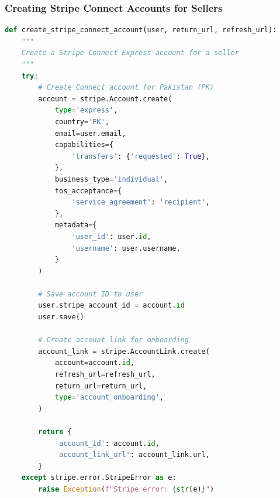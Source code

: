 \documentclass[12pt,a4paper]{article}
\begin{document}
\subsubsection{Creating Stripe Connect Accounts for Sellers}
\begin{lstlisting}[language=Python, caption={Stripe Connect Account Creation (api/stripe\_utils.py)}]
def create_stripe_connect_account(user, return_url, refresh_url):
    """
    Create a Stripe Connect Express account for a seller
    """
    try:
        # Create Connect account for Pakistan (PK)
        account = stripe.Account.create(
            type='express',
            country='PK',
            email=user.email,
            capabilities={
                'transfers': {'requested': True},
            },
            business_type='individual',
            tos_acceptance={
                'service_agreement': 'recipient',
            },
            metadata={
                'user_id': user.id,
                'username': user.username,
            }
        )
        
        # Save account ID to user
        user.stripe_account_id = account.id
        user.save()
        
        # Create account link for onboarding
        account_link = stripe.AccountLink.create(
            account=account.id,
            refresh_url=refresh_url,
            return_url=return_url,
            type='account_onboarding',
        )
        
        return {
            'account_id': account.id,
            'account_link_url': account_link.url,
        }
    except stripe.error.StripeError as e:
        raise Exception(f"Stripe error: {str(e)}")
\end{lstlisting}
\end{document}
